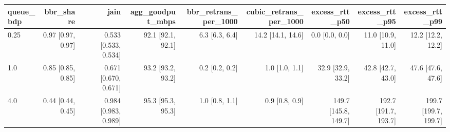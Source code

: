 \begin{tabular}{lrrrrrrrr}
queue_bdp & bbr\_share & jain & agg\_goodput\_mbps & bbr\_retrans\_per\_1000 & cubic\_retrans\_per\_1000 & excess\_rtt\_p50 & excess\_rtt\_p95 & excess\_rtt\_p99 \\ \hline
0.25 & 0.97 [0.97, 0.97] & 0.533 [0.533, 0.534] & 92.1 [92.1, 92.1] & 6.3 [6.3, 6.4] & 14.2 [14.1, 14.6] & 0.0 [0.0, 0.0] & 11.0 [10.9, 11.0] & 12.2 [12.2, 12.2] \\
1.0 & 0.85 [0.85, 0.85] & 0.671 [0.670, 0.671] & 93.2 [93.2, 93.2] & 0.2 [0.2, 0.2] & 1.0 [1.0, 1.1] & 32.9 [32.9, 33.2] & 42.8 [42.7, 43.0] & 47.6 [47.6, 47.6] \\
4.0 & 0.44 [0.44, 0.45] & 0.984 [0.983, 0.989] & 95.3 [95.3, 95.3] & 1.0 [0.8, 1.1] & 0.9 [0.8, 0.9] & 149.7 [145.8, 149.7] & 192.7 [191.7, 193.7] & 199.7 [199.7, 199.7] \\
\end{tabular}
